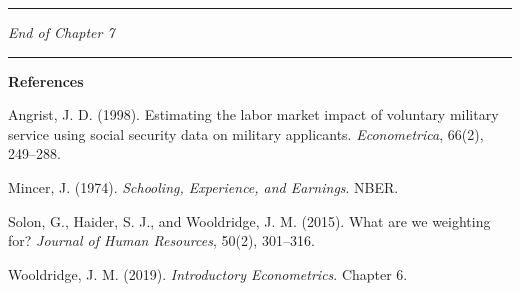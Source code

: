\medskip\hrule\medskip

\textit{End of Chapter 7}

\medskip\hrule\medskip

\textbf{References}

Angrist, J. D. (1998). Estimating the labor market impact of voluntary military service using social security data on military applicants. \textit{Econometrica}, 66(2), 249--288.

Mincer, J. (1974). \textit{Schooling, Experience, and Earnings}. NBER.

Solon, G., Haider, S. J., and Wooldridge, J. M. (2015). What are we weighting for? \textit{Journal of Human Resources}, 50(2), 301--316.

Wooldridge, J. M. (2019). \textit{Introductory Econometrics}. Chapter 6.
